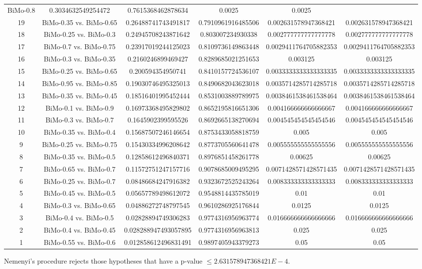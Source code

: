 \documentclass[a4paper,10pt]{article}
\begin{document}
\begin{landscape}
\begin{table}[!htp]
\begin{tabular}{cccccc}
BiMo-0.8&0.3034632549254472&0.7615368462878634&0.0025&0.0025\\19&BiMo-0.35 vs. BiMo-0.65&0.26488741743491817&0.7910961916485506&0.002631578947368421&0.002631578947368421\\18&BiMo-0.25 vs. BiMo-0.3&0.24945708243871642&0.803007234930338&0.002777777777777778&0.002777777777777778\\17&BiMo-0.7 vs. BiMo-0.75&0.23917019244125023&0.8109736149863448&0.0029411764705882353&0.0029411764705882353\\16&BiMo-0.3 vs. BiMo-0.35&0.2160246899469427&0.8289685021251653&0.003125&0.003125\\15&BiMo-0.25 vs. BiMo-0.65&0.200594354950741&0.8410157724536107&0.0033333333333333335&0.0033333333333333335\\14&BiMo-0.95 vs. BiMo-0.85&0.19030746495325013&0.8490682043623018&0.0035714285714285718&0.0035714285714285718\\13&BiMo-0.35 vs. BiMo-0.45&0.18516401995452444&0.8531003889789975&0.0038461538461538464&0.0038461538461538464\\12&BiMo-0.1 vs. BiMo-0.9&0.16973368495829802&0.8652195816651306&0.004166666666666667&0.004166666666666667\\11&BiMo-0.3 vs. BiMo-0.7&0.1645902399595526&0.8692665138270694&0.004545454545454546&0.004545454545454546\\10&BiMo-0.35 vs. BiMo-0.4&0.15687507246146654&0.8753433058818759&0.005&0.005\\9&BiMo-0.25 vs. BiMo-0.75&0.15430334996208642&0.8773705560641478&0.005555555555555556&0.005555555555555556\\8&BiMo-0.35 vs. BiMo-0.5&0.12858612496840371&0.8976851458261778&0.00625&0.00625\\7&BiMo-0.65 vs. BiMo-0.7&0.11572751247157716&0.9078685009495295&0.0071428571428571435&0.0071428571428571435\\6&BiMo-0.25 vs. BiMo-0.7&0.08486684247916382&0.9323672525243264&0.008333333333333333&0.008333333333333333\\5&BiMo-0.45 vs. BiMo-0.5&0.05657789498612072&0.9548814435785019&0.01&0.01\\4&BiMo-0.3 vs. BiMo-0.65&0.04886272748797545&0.9610286925176844&0.0125&0.0125\\3&BiMo-0.4 vs. BiMo-0.5&0.02828894749306283&0.9774316956963774&0.016666666666666666&0.016666666666666666\\2&BiMo-0.4 vs. BiMo-0.45&0.028288947493057895&0.9774316956963813&0.025&0.025\\1&BiMo-0.55 vs. BiMo-0.6&0.012858612496831491&0.9897405943379273&0.05&0.05\\\hline
\end{tabular}
\end{table}
Nemenyi's procedure rejects those hypotheses that have a p-value $\le2.631578947368421E-4$.



\end{landscape}
\end{document}
